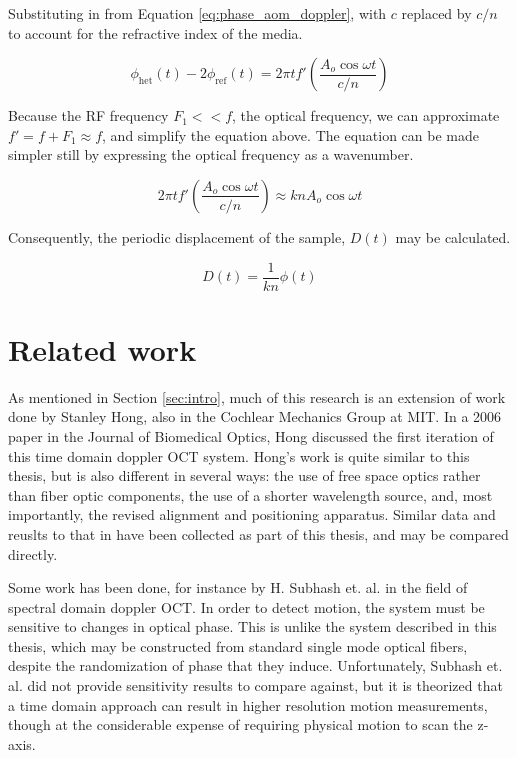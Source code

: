 Substituting in from Equation \ref{eq:phase_aom_doppler}, with $c$ replaced by $c/n$ to account for the refractive index of the media.

\begin{equation}
\phi_{\mathrm{het}}(t) - 2 \phi_{\mathrm{ref}}(t) = 2 \pi t f'  \left( \frac{A_o \cos{\omega t}}{c/n} \right)
\end{equation}

Because the RF frequency $F_1 << f$, the optical frequency, we can approximate $f' = f + F_1 \approx f$, and simplify the equation above. The equation can be made simpler still by expressing the optical frequency as a wavenumber.

\begin{equation}
2 \pi t f'  \left( \frac{A_o \cos{\omega t}}{c/n} \right) \approx k n A_o \cos{\omega t}
\end{equation}

Consequently, the periodic displacement of the sample, $D(t)$ may be calculated.


\begin{equation}
D(t) = \frac{1}{kn} \phi(t)
\end{equation}

\section{Related work}

As mentioned in Section \ref{sec:intro}, much of this research is an extension of work done by Stanley Hong, also in the Cochlear Mechanics Group at MIT. In a 2006 paper in the Journal of Biomedical Optics, Hong discussed the first iteration of this time domain doppler OCT system. \cite{hong} Hong's work is quite similar to this thesis, but is also different in several ways: the use of free space optics rather than fiber optic components, the use of a shorter wavelength source, and, most importantly, the revised alignment and positioning apparatus. Similar data and reuslts to that in \cite{hong} have been collected as part of this thesis, and may be compared directly.


Some work has been done, for instance by H. Subhash et. al. in the field of spectral domain doppler OCT. \cite{Subhash2012} In order to detect motion, the system must be sensitive to changes in optical phase. This is unlike the system described in this thesis, which may be constructed from standard single mode optical fibers, despite the randomization of phase that they induce. Unfortunately, Subhash et. al. did not provide sensitivity results to compare against, but it is theorized that a time domain approach can result in higher resolution motion measurements, though at the considerable expense of requiring physical motion to scan the z-axis.


